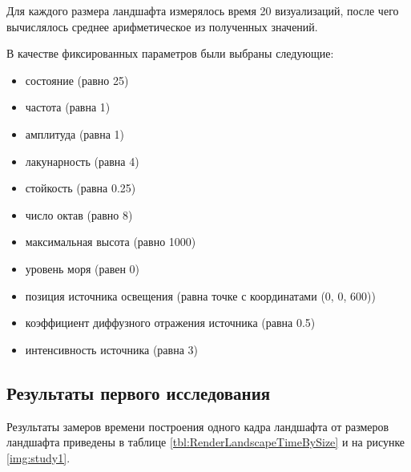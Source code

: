 Для каждого размера ландшафта измерялось время 20 визуализаций, после чего вычислялось среднее арифметическое из полученных значений.

В качестве фиксированных параметров были выбраны следующие:

\begin{itemize}[label=--]
	\item состояние (равно 25)
	\item частота (равна 1)
	\item амплитуда (равна 1)
	\item лакунарность (равна 4)
	\item стойкость (равна 0.25)
	\item число октав (равно 8)
	\item максимальная высота (равно 1000)
	\item уровень моря (равен 0)
	\item позиция источника освещения (равна точке с координатами (0, 0, 600))
	\item коэффициент диффузного отражения источника (равна 0.5)
	\item интенсивность источника (равна 3)
\end{itemize}

\clearpage

\subsection{Результаты первого исследования}

Результаты замеров времени построения одного кадра ландшафта от размеров ландшафта приведены в таблице \ref{tbl:RenderLandscapeTimeBySize} и на рисунке \ref{img:study1}.

